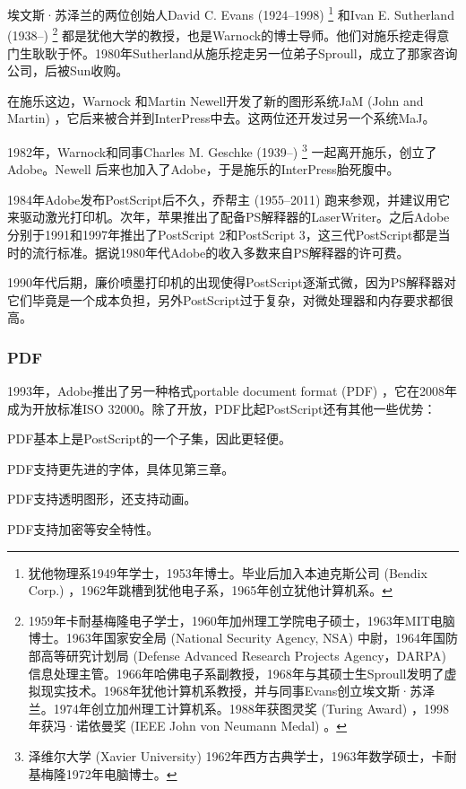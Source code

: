 埃文斯·苏泽兰的两位创始人David C. Evans (1924--1998)\indexEvans{} \footnote{犹他物理系1949年学士，1953年博士。毕业后加入本迪克斯公司 (Bendix Corp.) ，1962年跳槽到犹他电子系，1965年创立犹他计算机系。} 和Ivan E. Sutherland (1938--)\indexSutherland{} \footnote{1959年卡耐基梅隆电子学士，1960年加州理工学院电子硕士，1963年MIT电脑博士。1963年国家安全局 (National Security Agency, NSA) 中尉，1964年国防部高等研究计划局 (Defense Advanced Research Projects Agency，DARPA) 信息处理主管。1966年哈佛电子系副教授，1968年与其硕士生Sproull发明了虚拟现实技术。1968年犹他计算机系教授，并与同事Evans创立埃文斯·苏泽兰。1974年创立加州理工计算机系。1988年获图灵奖 (Turing Award) ，1998年获冯·诺依曼奖 (IEEE John von Neumann Medal) 。} 都是犹他大学的教授，也是Warnock的博士导师。他们对施乐挖走得意门生耿耿于怀。1980年Sutherland从施乐挖走另一位弟子Sproull，成立了那家咨询公司，后被Sun收购。

在施乐这边，Warnock 和Martin Newell\indexNewell 开发了新的图形系统JaM (John and Martin) ，它后来被合并到InterPress中去。这两位还开发过另一个系统MaJ。

1982年，Warnock和同事Charles M. Geschke (1939--)\indexGeschke{} \footnote{泽维尔大学 (Xavier University) 1962年西方古典学士，1963年数学硕士，卡耐基梅隆1972年电脑博士。} 一起离开施乐，创立了Adobe\indexAdobe。Newell 后来也加入了Adobe，于是施乐的InterPress胎死腹中。

1984年Adobe发布PostScript后不久，乔帮主 (1955--2011)\indexJobs{} 跑来参观，并建议用它来驱动激光打印机。次年，苹果推出了配备PS解释器的LaserWriter。之后Adobe分别于1991和1997年推出了PostScript 2和PostScript 3，这三代PostScript都是当时的流行标准。据说1980年代Adobe的收入多数来自PS解释器的许可费。

1990年代后期，廉价喷墨打印机的出现使得PostScript逐渐式微，因为PS解释器对它们毕竟是一个成本负担，另外PostScript过于复杂，对微处理器和内存要求都很高。

\subsubsection{PDF}
1993年，Adobe推出了另一种格式portable document format (PDF) ，它在2008年成为开放标准ISO\indexISO{} 32000。除了开放，PDF比起PostScript还有其他一些优势：

\begin{compactitem}
   \item PDF基本上是PostScript的一个子集，因此更轻便。
   \item PDF支持更先进的字体，具体见第三章。
   \item PDF支持透明图形，还支持动画。
   \item PDF支持加密等安全特性。
\end{compactitem}

